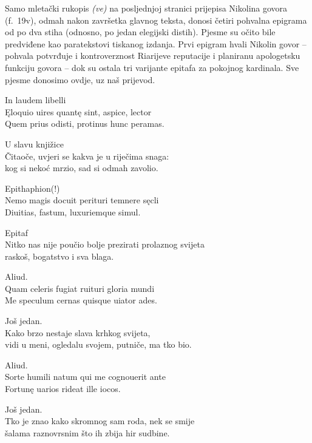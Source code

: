 \documentclass[a5paper,twoside]{article}
\renewenvironment{quote}
               {\list{}{\rightmargin 0mm
                \leftmargin 7mm
                \itemindent 0em}%
                \item\relax}
               {\endlist}
\begin{document}
Samo mletački rukopis \textit{(ve)} na posljednjoj stranici prijepisa Nikolina govora (f.~19v), odmah nakon završetka glavnog teksta, donosi četiri pohvalna epigrama od po dva stiha (odnosno, po jedan elegijski distih). Pjesme su očito bile predviđene kao paratekstovi tiskanog izdanja. Prvi epigram hvali Nikolin govor – pohvala potvrđuje i kontroverznost Riarijeve reputacije i planiranu apologetsku funkciju govora – dok su ostala tri varijante epitafa za pokojnog kardinala. Sve pjesme donosimo ovdje, uz naš prijevod.

\begin{quote}
In laudem libelli\\
Ęloquio uires quantę sint, aspice, lector\\
	Quem prius odisti, protinus hunc peramas.

U slavu knjižice\\
Čitaoče, uvjeri se kakva je u riječima snaga:\\
	kog si nekoć mrzio, sad si odmah zavolio.

\bigskip

Epithaphion(!)\\
Nemo magis docuit perituri temnere sęcli\\
	Diuitias, fastum, luxuriemque simul.

Epitaf\\
Nitko nas nije poučio bolje prezirati prolaznog svijeta\\
	raskoš, bogatstvo i sva blaga.

\bigskip

Aliud.\\
Quam celeris fugiat ruituri gloria mundi\\
	Me speculum cernas quisque uiator ades.

Još jedan.\\
Kako brzo nestaje slava krhkog svijeta,\\
	vidi u meni, ogledalu svojem, putniče, ma tko bio.

\bigskip

Aliud.\\
Sorte humili natum qui me cognouerit ante\\
	Fortunę uarios rideat ille iocos.

Još jedan.\\
Tko je znao kako skromnog sam roda, nek se smije\\
	šalama raznovrsnim što ih zbija hir sudbine.

\end{quote}
\end{document}

